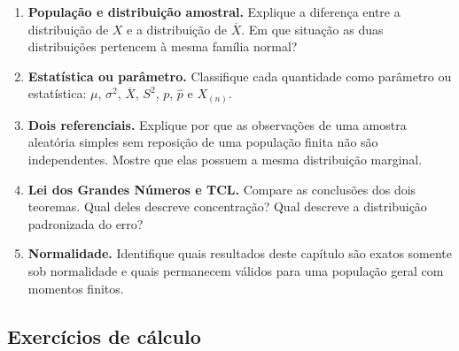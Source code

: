 \documentclass[
  letterpaper,
  DIV=11,
  numbers=noendperiod]{scrreprt}
\begin{document}
\begin{enumerate}
\def\labelenumi{\arabic{enumi}.}
\item
  \textbf{População e distribuição amostral.} Explique a diferença entre
  a distribuição de \(X\) e a distribuição de \(\overline{X}\). Em que
  situação as duas distribuições pertencem à mesma família normal?
\item
  \textbf{Estatística ou parâmetro.} Classifique cada quantidade como
  parâmetro ou estatística: \(\mu\), \(\sigma^2\), \(\overline{X}\),
  \(S^2\), \(p\), \(\widehat p\) e \(X_{(n)}\).
\item
  \textbf{Dois referenciais.} Explique por que as observações de uma
  amostra aleatória simples sem reposição de uma população finita não
  são independentes. Mostre que elas possuem a mesma distribuição
  marginal.
\item
  \textbf{Lei dos Grandes Números e TCL.} Compare as conclusões dos dois
  teoremas. Qual deles descreve concentração? Qual descreve a
  distribuição padronizada do erro?
\item
  \textbf{Normalidade.} Identifique quais resultados deste capítulo são
  exatos somente sob normalidade e quais permanecem válidos para uma
  população geral com momentos finitos.
\end{enumerate}

\subsection*{Exercícios de cálculo}\label{exercuxedcios-de-cuxe1lculo}
\end{document}
